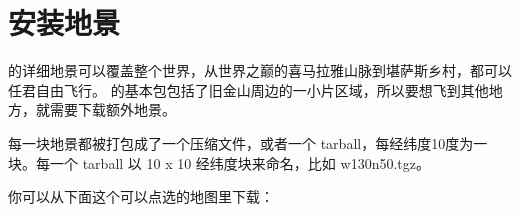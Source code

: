 \ifchinese
\section{安装地景}
\fi

\ifchinese
\FlightGear{} 的详细地景可以覆盖整个世界，从世界之巅的喜马拉雅山脉到堪萨斯乡村，都可以任君自由飞行。\FlightGear{}  的基本包包括了旧金山周边的一小片区域，所以要想飞到其他地方，就需要下载额外地景。

每一块地景都被打包成了一个压缩文件，或者一个 tarball，每经纬度10度为一块。每一个 tarball 以 10 x 10 经纬度块来命名，比如 w130n50.tgz。

你可以从下面这个可以点选的地图里下载：
\fi
%
%

